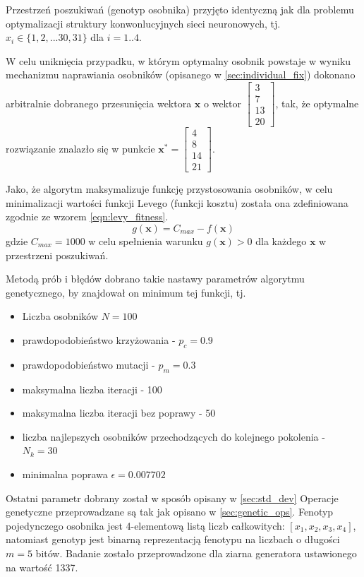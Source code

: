 Przestrzeń poszukiwań (genotyp osobnika) przyjęto identyczną jak dla problemu optymalizacji struktury konwonlucyjnych sieci neuronowych, tj. $x_i \in \lbrace 1, 2, ... 30, 31 \rbrace$ dla $i = 1..4$.

W celu uniknięcia przypadku, w którym optymalny osobnik powstaje w wyniku mechanizmu naprawiania osobników (opisanego w \ref{sec:individual_fix}) dokonano arbitralnie dobranego przesunięcia wektora $\mathbf{x}$ o wektor $\begin{bmatrix}3 \\ 7 \\ 13 \\ 20\end{bmatrix}$, tak, że optymalne rozwiązanie znalazło się w punkcie $\mathbf{x^*} = \begin{bmatrix}4 \\ 8 \\ 14 \\ 21\end{bmatrix}$.

Jako, że algorytm maksymalizuje funkcję przystosowania osobników, w celu minimalizacji wartości funkcji Levego (funkcji kosztu) została ona zdefiniowana zgodnie ze wzorem \ref{eqn:levy_fitness}. \cite{bialaszewski2012}
\begin{equation}\label{eqn:levy_fitness}
  g(\mathbf{x}) = C_{max} - f(\mathbf{x})
\end{equation}
gdzie $C_{max} = 1000$ w celu spełnienia warunku $g(\textbf{x}) > 0$ dla każdego $\textbf{x}$ w przestrzeni poszukiwań.

Metodą prób i błędów dobrano takie nastawy parametrów algorytmu genetycznego, by znajdował on minimum tej funkcji, tj.
\begin{itemize}
  \item Liczba osobników $N = 100$
  \item prawdopodobieństwo krzyżowania - $p_{c} = 0.9$
  \item prawdopodobieństwo mutacji - $p_{m} = 0.3$
  \item maksymalna liczba iteracji - 100
  \item maksymalna liczba iteracji bez poprawy - 50
  \item liczba najlepszych osobników przechodzących do kolejnego pokolenia - $ N_{k} = 30$
  \item minimalna poprawa $\epsilon = 0.007702$
\end{itemize}

Ostatni parametr dobrany został w sposób opisany w \ref{sec:std_dev}
Operacje genetyczne przeprowadzane są tak jak opisano w \ref{sec:genetic_ops}.
Fenotyp pojedynczego osobnika jest 4-elementową listą liczb całkowitych: $[ x_1, x_2, x_3, x_4]$, natomiast genotyp jest binarną reprezentacją fenotypu na liczbach o długości $m=5$ bitów.
Badanie zostało przeprowadzone dla ziarna generatora ustawionego na wartość 1337.

